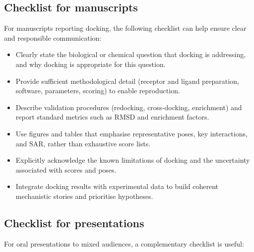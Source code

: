 \documentclass[12pt]{article}
\begin{document}
\subsection{Checklist for manuscripts}

For manuscripts reporting docking, the following checklist can help ensure clear and responsible communication:

\begin{itemize}
  \item Clearly state the biological or chemical question that docking is addressing, and why docking is appropriate for this question.\cite{CH11_Kitchen2004,CH11_Forli2015,CH11_Cheng2012}
  \item Provide sufficient methodological detail (receptor and ligand preparation, software, parameters, scoring) to enable reproduction.\cite{CH11_Pagadala2017,CH11_Berry2015,CH11_Cheng2012}
  \item Describe validation procedures (redocking, cross-docking, enrichment) and report standard metrics such as RMSD and enrichment factors.\cite{CH11_Warren2006,CH11_Forli2015,CH11_ConsensusDocking2023}
  \item Use figures and tables that emphasise representative poses, key interactions, and SAR, rather than exhaustive score lists.\cite{CH11_Berry2015,CH11_Forli2015,CH11_zhu2022}
  \item Explicitly acknowledge the known limitations of docking and the uncertainty associated with scores and poses.\cite{CH11_BindingAffinity2018,CH11_IsItReliable2018,CH11_EmpiricalScoring2018}
  \item Integrate docking results with experimental data to build coherent mechanistic stories and prioritise hypotheses.\cite{CH11_Cheng2012,CH11_zhu2022,CH11_cosconati2010}
\end{itemize}

\subsection{Checklist for presentations}

For oral presentations to mixed audiences, a complementary checklist is useful:
\end{document}
